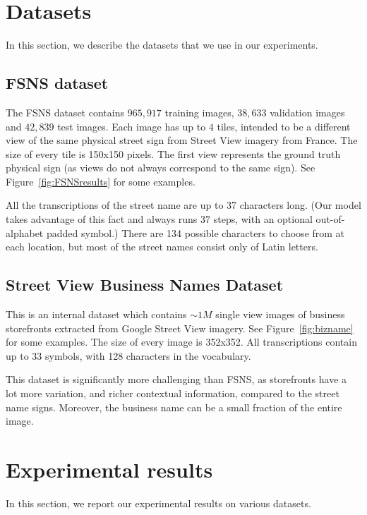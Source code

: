 \documentclass[conference]{IEEEtran}
\begin{document}
 \section{Datasets}

In this section, we describe the datasets that we use in our experiments.

\subsection{FSNS dataset}

The FSNS dataset \cite{smith2016end} contains $965,917$ training
images, $38,633$ validation images and $42,839$ test images. Each
image has up to $4$ tiles, intended to be a different view of the same
physical street sign from Street View imagery from France. The size of
every tile is 150x150 pixels. The first view represents the ground
truth physical sign (as views do not always correspond to the same
sign). See Figure~\ref{fig:FSNSresults} for some examples.  

All the transcriptions of the street name are up to 37 characters
long. (Our model takes advantage of this fact and always runs 37
steps, with an optional out-of-alphabet padded symbol.) There are 134
possible characters to choose from at each location, but most of the
street names consist only of Latin letters. 

\subsection{Street View Business Names Dataset}

This is an internal dataset which contains $\sim 1M$ single view
images of business storefronts extracted from Google Street View 
imagery. See Figure~\ref{fig:bizname} for some examples. The size
of every image is 352x352. All transcriptions contain up to 33
symbols, with 128 characters in the vocabulary. 

This dataset is significantly more challenging than FSNS, as
storefronts have a lot more variation, and richer contextual
information, compared to the street name signs. Moreover, the business
name can be a small fraction of the entire image. 
 \section{Experimental results}

In this section, we report our experimental results on various
datasets.
\end{document}
